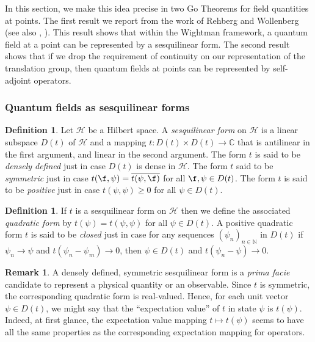 \documentclass[12pt]{article}
\theoremstyle{definition}
\theoremstyle{definition}
\newtheorem{defn}[thm]{Definition}
\newtheorem{note}[thm]{Remark}
\theoremstyle{remark}
\def\2#1{{\mathcal #1}}
\def\7#1{{\mathbb #1}}
\begin{document}
In this section, we make this idea precise in two Go Theorems for
field quantities at points.  The first result we report from the work
of Rehberg and Wollenberg \cite{wollenberg86a,wollenberg86b} (see also
\cite{fred81}, \cite{bostelmann,bostelmann-b}).  This result shows
that within the Wightman framework, a quantum field at a point can be
represented by a sesquilinear form.  The second result shows that if
we drop the requirement of continuity on our representation of the
translation group, then quantum fields at points can be represented by
self-adjoint operators.

\subsubsection{Quantum fields as sesquilinear forms}

\begin{defn} Let $\2H$ be a Hilbert space.  A \emph{sesquilinear form}
  on $\2H$ is a linear subspace $D(t)$ of $\2H$ and a mapping $t:D(t)
  \times D(t) \to \7C$ that is antilinear in the first argument, and
  linear in the second argument.  The form $t$ is said to be
  \emph{densely defined} just in case $D(t)$ is dense in $\2H$.  The
  form $t$ said to be \emph{symmetric} just in case $t(\f ,\psi
  )=\overline{t(\psi ,\f )}$ for all $\f ,\psi \in D(t)$.  The form
  $t$ is said to be \emph{positive} just in case $t(\psi ,\psi )\geq
  0$ for all $\psi \in D(t)$.
\end{defn}

\begin{defn} If $t$ is a sesquilinear form on $\2H$ then we define the
  associated \emph{quadratic form} by $t(\psi )=t(\psi ,\psi )$ for
  all $\psi \in D(t)$.  A positive quadratic form $t$ is said to be
  \emph{closed} just in case for any sequences $(\psi _n)_{n\in \7N }$
  in $D(t)$ if $\psi _n\to \psi$ and $t(\psi _n-\psi _m)\to 0$, then
  $\psi \in D(t)$ and $t(\psi _n-\psi )\to 0$.  \end{defn}

\begin{note} A densely defined, symmetric sesquilinear form is a
  \emph{prima facie} candidate to represent a physical quantity or an
  observable.  Since $t$ is symmetric, the corresponding quadratic
  form is real-valued.  Hence, for each unit vector $\psi \in D(t)$,
  we might say that the ``expectation value'' of $t$ in state $\psi$
  is $t(\psi )$.  Indeed, at first glance, the expectation value
  mapping $t\mapsto t(\psi )$ seems to have all the same properties as
  the corresponding expectation mapping for operators.
\end{note}
\end{document}

